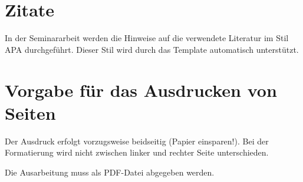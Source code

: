 \section{Zitate}
\label{sec:zitate}

In der Seminararbeit werden die Hinweise auf die verwendete Literatur im Stil APA durchgeführt. Dieser Stil wird durch das Template automatisch unterstützt.

\section{Vorgabe für das Ausdrucken von Seiten}
\label{sec:ausdruck}

Der Ausdruck erfolgt vorzugsweise beidseitig (Papier einsparen!). Bei der Formatierung wird nicht zwischen linker und rechter Seite unterschieden.

Die Ausarbeitung muss als PDF-Datei abgegeben werden.

